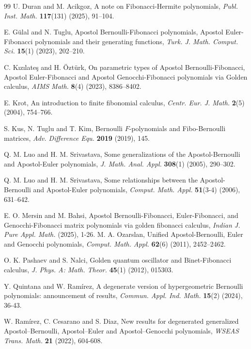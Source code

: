 \documentclass[12pt, a4paper]{article}
\theoremstyle{definition}
\numberwithin{equation}{section}
\begin{document}
\begin{thebibliography}{99}
U. Duran and M. Acikgoz, A note on Fibonacci-Hermite polynomials, \textit{Publ. Inst. Math.} \textbf{117}(131) (2025), 91–104.

E. G\"{u}lal and N. Tuglu, Apostol Bernoulli-Fibonacci polynomials, Apostol Euler-Fibonacci polynomials and their generating functions, \textit{Turk. J. Math. Comput. Sci.} \textbf{15}(1) (2023), 202–210.

C. K{\i}z{\i}late\c{s} and H. \"{O}zt\"{u}rk, On parametric types of Apostol Bernoulli-Fibonacci, Apostol Euler-Fibonacci and Apostol Genocchi-Fibonacci polynomials via Golden calculus, \textit{AIMS Math.} \textbf{8}(4) (2023), 8386–8402.


E. Krot, An introduction to finite fibonomial calculus, \textit{Centr. Eur. J. Math.} \textbf{2}(5) (2004), 754–766.

S. Kus, N. Tuglu and T. Kim, Bernoulli $F$-polynomials and Fibo-Bernoulli matrices, \textit{Adv. Difference Equ.} \textbf{2019} (2019), 145.

Q. M. Luo and H. M. Srivastava, Some generalizations of the Apostol-Bernoulli and Apostol-Euler polynomials, \textit{J. Math. Anal. Appl.} \textbf{308}(1) (2005), 290–302.

Q. M. Luo and H. M. Srivastava, Some relationships between the Apostol-Bernoulli and Apostol-Euler polynomials, \textit{Comput. Math. Appl.} \textbf{51}(3-4) (2006), 631–642.

E. O. Mersin and M. Bahsi, Apostol Bernoulli-Fibonacci, Euler-Fibonacci, and Genocchi-Fibonacci matrix polynomials via golden fibonacci calculus, \textit{Indian J. Pure Appl. Math.} (2025), 1-26.
M. A. Ozarslan, Unified Apostol-Bernoulli, Euler and Genocchi polynomials, \textit{Comput. Math. Appl.} \textbf{62}(6) (2011), 2452–2462.

O. K. Pashaev and S. Nalci, Golden quantum oscillator and Binet-Fibonacci calculus, \textit{J. Phys. A: Math. Theor.} \textbf{45}(1) (2012), 015303.

Y. Quintana and W. Ram\'irez, A degenerate version of hypergeometric Bernoulli polynomials: announcement of results, \textit{Commun. Appl. Ind. Math.} \textbf{15}(2) (2024), 36-43.

W. Ram\'irez, C. Cesarano and S. Diaz, New results for degenerated generalized Apostol–Bernoulli, Apostol–Euler and Apostol–Genocchi polynomials, \textit{WSEAS Trans. Math.} \textbf{21} (2022), 604-608.


\end{thebibliography}
\end{document}
